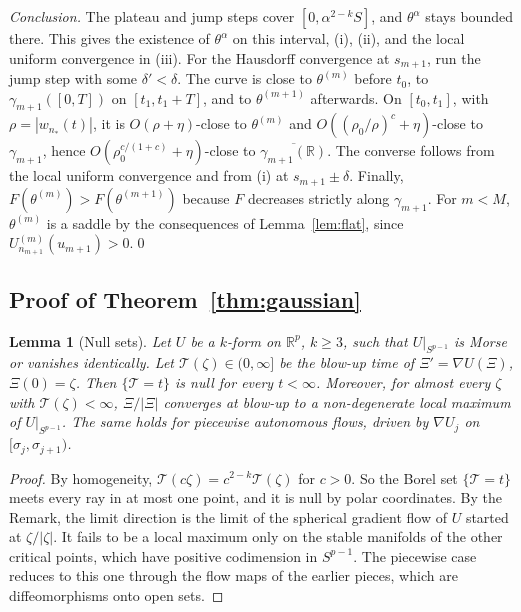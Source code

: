 \documentclass[11pt]{article}
\newtheorem{lemma}{Lemma}
\theoremstyle{definition}
\theoremstyle{remark}
\newcommand{\R}{\mathbb{R}}
\newcommand{\cT}{\mathcal{T}}
\begin{document}
\emph{Conclusion.} The plateau and jump steps cover $[0,\alpha^{2-k}S]$, and $\theta^\alpha$ stays bounded there. This gives the existence of $\theta^\alpha$ on this interval, (i), (ii), and the local uniform convergence in (iii). For the Hausdorff convergence at $s_{m+1}$, run the jump step with some $\delta'<\delta$. The curve is close to $\theta^{(m)}$ before $t_0$, to $\gamma_{m+1}([0,T])$ on $[t_1,t_1+T]$, and to $\theta^{(m+1)}$ afterwards. On $[t_0,t_1]$, with $\rho=|w_{n_*}(t)|$, it is $O(\rho+\eta)$-close to $\theta^{(m)}$ and $O((\rho_0/\rho)^c+\eta)$-close to $\gamma_{m+1}$, hence $O(\rho_0^{c/(1+c)}+\eta)$-close to $\overline{\gamma_{m+1}(\R)}$. The converse follows from the local uniform convergence and from (i) at $s_{m+1}\pm\delta$. Finally, $F(\theta^{(m)})>F(\theta^{(m+1)})$ because $F$ decreases strictly along $\gamma_{m+1}$. For $m<M$, $\theta^{(m)}$ is a saddle by the consequences of Lemma~\ref{lem:flat}, since $U^{(m)}_{n_{m+1}}(u_{m+1})>0$.\qed

\subsection*{Proof of Theorem~\ref{thm:gaussian}}

\begin{lemma}[Null sets]\label{lem:null}
Let $U$ be a $k$-form on $\R^p$, $k\ge3$, such that $U|_{S^{p-1}}$ is Morse or vanishes identically. Let $\cT(\zeta)\in(0,\infty]$ be the blow-up time of $\Xi'=\nabla U(\Xi)$, $\Xi(0)=\zeta$. Then $\{\cT=t\}$ is null for every $t<\infty$. Moreover, for almost every $\zeta$ with $\cT(\zeta)<\infty$, $\Xi/|\Xi|$ converges at blow-up to a non-degenerate local maximum of $U|_{S^{p-1}}$. The same holds for piecewise autonomous flows, driven by $\nabla U_j$ on $[\sigma_j,\sigma_{j+1})$.
\end{lemma}

\begin{proof}
By homogeneity, $\cT(c\zeta)=c^{2-k}\cT(\zeta)$ for $c>0$. So the Borel set $\{\cT=t\}$ meets every ray in at most one point, and it is null by polar coordinates. By the Remark, the limit direction is the limit of the spherical gradient flow of $U$ started at $\zeta/|\zeta|$. It fails to be a local maximum only on the stable manifolds of the other critical points, which have positive codimension in $S^{p-1}$. The piecewise case reduces to this one through the flow maps of the earlier pieces, which are diffeomorphisms onto open sets.
\end{proof}
\end{document}
